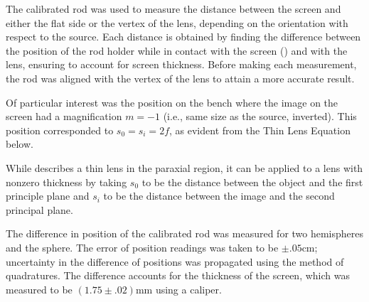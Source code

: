 \begin{paper}
	The calibrated rod was used to measure the distance between the screen and either the flat side or the vertex of the lens, depending on the orientation with respect to the source. Each distance is obtained by finding the difference between the position of the rod holder while in contact with the screen (\figSetup) and with the lens, ensuring to account for screen thickness. Before making each measurement, the rod was aligned with the vertex of the lens to attain a more accurate result.
	
	Of particular interest was the position on the bench where the image on the screen had a magnification \( m = -1 \) (i.e., same size as the source, inverted). This position corresponded to \( s_0 = s_i = 2f \), as evident from the Thin Lens Equation below.
	\begin{paperwhere}
	\end{paperwhere}

	While \eqThinLensEquation describes a thin lens in the paraxial region, it can be applied to a lens with nonzero thickness by taking \( s_0 \) to be the distance between the object and the first principle plane and \( s_i \) to be the distance between the image and the second principal plane.
	

	The difference in position of the calibrated rod was measured for two hemispheres and the sphere. The error of position readings was taken to be \( \pm .05 \si{\cm} \); uncertainty in the difference of positions was propagated using the method of quadratures. The difference accounts for the thickness of the screen, which was measured to be \( (1.75 \pm .02) \si{\mm} \) using a caliper. 

	

\end{paper}
